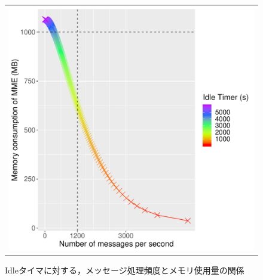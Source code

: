 \documentclass[a4j]{ujarticle}
\begin{document}
\begin{figure}[htbp]
  \begin{center}
    \begin{tabular}{c}
      \begin{minipage}{1\hsize}
        \begin{center}
          \includegraphics[width=0.6\hsize]{theory_1_all_30s_theory.pdf}
          \caption{Idleタイマに対する，メッセージ処理頻度とメモリ使用量の関係}
          \label{theory_1_all_30s_theory}
        \end{center}
      \end{minipage}
    \end{tabular}
  \end{center}
\end{figure}
\end{document}
